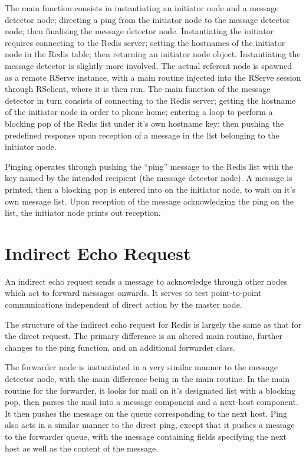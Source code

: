 \documentclass[10pt,a4paper]{article}
\begin{document}
The main function consists in instantiating an initiator node and a message
detector node; directing a ping from the initiator node to the message detector
node; then finalising the message detector node.
Instantiating the initiator requires connecting to the Redis server; setting
the hostnames of the initiator node in the Redis table; then returning an
initiator node object.
Instantiating the message detector is slightly more involved. The actual
referent node is spawned as a remote RServe instance, with a main routine
injected into the RServe session through RSclient, where it is then run.
The main function of the message detector in turn consists of connecting to the
Redis server; getting the hostname of the initiator node in order to phone
home; entering a loop to perform a blocking pop of the Redis list under it's
own hostname key; then pushing the predefined response upon reception of a
message in the list belonging to the initiator node.

Pinging operates through pushing the ``ping'' message to the Redis list with
the key named by the intended recipient (the message detector node). 
A message is printed, then a blocking pop is entered into on the initiator
node, to wait on it's own message list. 
Upon reception of the message acknowledging the ping on the list, the initiator
node prints out reception.

\section{Indirect Echo Request}
An indirect echo request sends a message to acknowledge through other nodes
which act to forward messages onwards.
It serves to test point-to-point communications independent of direct action by
the master node.

The structure of the indirect echo request for Redis is largely the same as
that for the direct request.
The primary difference is an altered main routine, further changes to the ping
function, and an additional forwarder class.

The forwarder node is instantiated in a very similar manner to the message
detector node, with the main difference being in the main routine.
In the main routine for the forwarder, it looks for mail on it's designated
list with a blocking pop, then parses the mail into a message component and a
next-host component. 
It then pushes the message on the queue corresponding to the next host.
Ping also acts in a similar manner to the direct ping, except that it pushes a
message to the forwarder queue, with the message containing fields specifying
the next host as well as the content of the message.



\printbibliography{}
\end{document}
